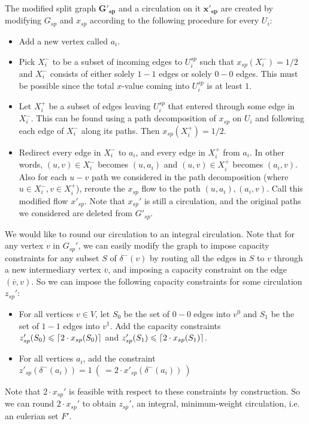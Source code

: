 \documentclass[./main.tex]{subfiles}
\DeclarePairedDelimiter\ceil{\lceil}{\rceil}
\begin{document}
		\begin{definition}\label{def:6.1}
			The modified split graph $\bm{G'_{sp}}$ and a circulation on it $\bm{x'_{sp}}$ are created by modifying $G_{sp}$ and $x_{sp}$ according to the following procedure for every $U_i$:
			\begin{itemize}[-]
				\item Add a new vertex called $a_i$.
				\item Pick $X_i^-$ to be a subset of incoming edges to $U_i^{sp}$ such that $x_{sp}(X_i^-) = 1/2$ and $X_i^-$ consists of either solely $1-1$ edges or solely $0-0$ edges. This must be possible since the total $x$-value coming into $U_i^{sp}$ is at least $1$.
				\item Let $X_i^+$ be a subset of edges leaving $U_i^{sp}$ that entered through some edge in $X_i^-$. This can be found using a path decomposition of $x_{sp}$ on $U_i$ and following each edge of $X_i^-$ along its paths. Then $x_{sp}(X_i^+) = 1/2$.
				\item Redirect every edge in $X_i^-$ to $a_i$, and every edge in $X_i^+$ from $a_i$. In other words, $(u,v)\in X_i^-$ becomes $(u,a_i)$ and $(u,v)\in X_i^+$ becomes $(a_i, v)$. Also for each $u-v$ path we considered in the path decomposition (where $u\in X_i^-, v\in X_i^+$), reroute the $x_{sp}$ flow to the path $(u,a_i),(a_i,v)$. Call this modified flow $x'_{sp}$. Note that $x_{sp}'$ is still a circulation, and the original paths we considered are deleted from $G'_{sp}$.\\
			\end{itemize}
		\end{definition}
		We would like to round our circulation to an integral circulation. 
		Note that for any vertex $v$ in $G_{sp}'$, we can easily modify the graph to impose capacity constraints for any subset $S$ of $\delta^-(v)$ by routing all the edges in $S$ to $v$ through a new intermediary vertex $\overline{v}$, and imposing a capacity constraint on the edge $(\overline{v},v)$. 
		So we can impose the following capacity constraints for some circulation $z_{sp}'$:
		\begin{itemize}[-]
			\item For all vertices $v\in V$, let $S_0$ be the set of $0-0$ edges into $v^0$ and $S_1$ be the set of $1-1$ edges into $v^1$. 
					Add the capacity constraints $z'_{sp}(S_0)\leqslant \ceil{2\cdot x_{sp}(S_0)}$ and $z'_{sp}(S_1)\leqslant \ceil{2\cdot x_{sp}(S_1)}$.
			\item For all vertices $a_i$, add the constraint $z'_{sp}(\delta^-(a_i)) = 1\  (\ = 2\cdot x'_{sp}(\delta^-(a_i))\ )$
		\end{itemize}
		Note that $2\cdot x_{sp}'$ is feasible with respect to these constraints by construction. 
		So we can round $2\cdot x_{sp}'$ to obtain $z_{sp}'$, an integral, minimum-weight circulation, i.e. an eulerian set $F'$.\\
		\vspace{2mm}
		
\end{document}
